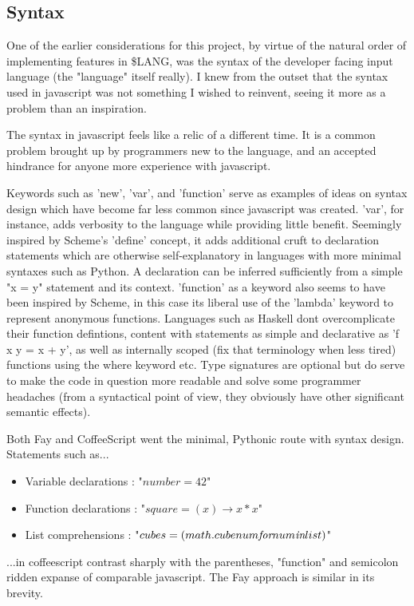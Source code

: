 \documentclass[11pt]{article}
\newcommand{\lang}{\$LANG}
\begin{document}
\subsection{Syntax}
One of the earlier considerations for this project, by virtue of the natural order
of implementing features in \lang, was the syntax of the developer facing input 
language (the "language" itself really). I knew from the outset that the syntax
used in javascript was not something I wished to reinvent, seeing it more as a
problem than an inspiration. 

The syntax in javascript feels like a relic of a different time. It is a common
problem brought up by programmers new to the language, and an accepted
hindrance for anyone more experience with javascript. 

Keywords such as 'new', 'var', and 'function' serve as examples of ideas on syntax
design which have become far less common since javascript was created. 'var', for
instance, adds verbosity to the language while providing little benefit. Seemingly
inspired by Scheme's 'define' concept, it adds additional cruft to declaration 
statements which are otherwise self-explanatory in languages with more minimal 
syntaxes such as Python. A declaration can be inferred sufficiently from a simple
"x = y" statement and its context. 'function' as a keyword also seems to have been
inspired by Scheme, in this case its liberal use of the 'lambda' keyword to represent
anonymous functions. Languages such as Haskell dont overcomplicate their function
defintions, content with statements as simple and declarative as 'f x y = x + y',
as well as internally scoped (fix that terminology when less tired) functions using
the where keyword etc.
Type signatures are optional but do serve to make the code in question more readable and
solve some programmer headaches (from a syntactical point of view, they obviously have other 
significant semantic effects). 

Both Fay and CoffeeScript went the minimal, Pythonic route with syntax design. Statements
such as...
\begin{itemize}
\item Variable declarations : "\(number = 42\)"
\item Function declarations : "\(square = (x) \rightarrow x * x\)"
\item List comprehensions : "\(cubes = (math.cube num \emph{for} num \emph{in} list)\)"
\end{itemize}

...in coffeescript contrast sharply with the parentheses, "function" and semicolon 
ridden expanse of comparable javascript. The Fay approach is similar in its brevity.
\end{document}
